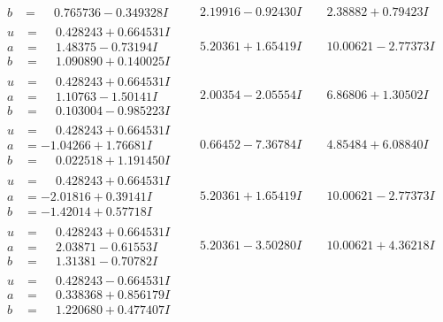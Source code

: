 \documentclass[1p]{elsarticle_modified}
\theoremstyle{definition}
\begin{document}
$$\begin{array}{c|c|c}
\begin{aligned}
b &= \phantom{-}0.765736 - 0.349328 I\end{aligned}
 & \phantom{-}2.19916 - 0.92430 I & \phantom{-}2.38882 + 0.79423 I \\ \hline\begin{aligned}
u &= \phantom{-}0.428243 + 0.664531 I \\
a &= \phantom{-}1.48375 - 0.73194 I \\
b &= \phantom{-}1.090890 + 0.140025 I\end{aligned}
 & \phantom{-}5.20361 + 1.65419 I & \phantom{-}10.00621 - 2.77373 I \\ \hline\begin{aligned}
u &= \phantom{-}0.428243 + 0.664531 I \\
a &= \phantom{-}1.10763 - 1.50141 I \\
b &= \phantom{-}0.103004 - 0.985223 I\end{aligned}
 & \phantom{-}2.00354 - 2.05554 I & \phantom{-}6.86806 + 1.30502 I \\ \hline\begin{aligned}
u &= \phantom{-}0.428243 + 0.664531 I \\
a &= -1.04266 + 1.76681 I \\
b &= \phantom{-}0.022518 + 1.191450 I\end{aligned}
 & \phantom{-}0.66452 - 7.36784 I & \phantom{-}4.85484 + 6.08840 I \\ \hline\begin{aligned}
u &= \phantom{-}0.428243 + 0.664531 I \\
a &= -2.01816 + 0.39141 I \\
b &= -1.42014 + 0.57718 I\end{aligned}
 & \phantom{-}5.20361 + 1.65419 I & \phantom{-}10.00621 - 2.77373 I \\ \hline\begin{aligned}
u &= \phantom{-}0.428243 + 0.664531 I \\
a &= \phantom{-}2.03871 - 0.61553 I \\
b &= \phantom{-}1.31381 - 0.70782 I\end{aligned}
 & \phantom{-}5.20361 - 3.50280 I & \phantom{-}10.00621 + 4.36218 I \\ \hline\begin{aligned}
u &= \phantom{-}0.428243 - 0.664531 I \\
a &= \phantom{-}0.338368 + 0.856179 I \\
b &= \phantom{-}1.220680 + 0.477407 I\end{aligned}

\end{array}$$
\end{document}
